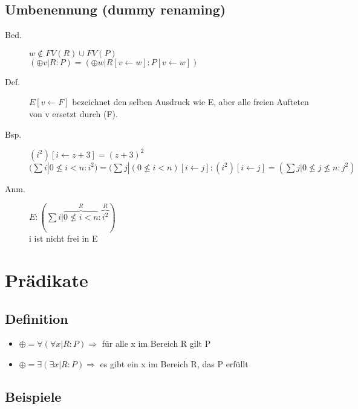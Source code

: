 \documentclass[a4paper,10pt]{article}
\newcommand{\la}{\leftarrow}
\begin{document}
\subsection{Umbenennung (dummy renaming)}
\begin{description}
	\item[Bed.] $w \notin FV(R) \cup FV(P)$ \\
		$(\oplus v | R : P) = (\oplus w | R[v \la w] : P[v \la w])$
	\item[Def.] $E[v \la F]$ bezeichnet den selben Ausdruck wie E, aber alle freien Aufteten von v ersetzt durch (F).
	\item[Bsp.] $(i^2)[i \la z+3] = (z+3)^2$ \\
		$(\sum i | 0 \nleq i < n : i^2) = (\sum j | (0 \nleq i < n)[i \la j] : (i^2)[i \la j] = (\sum j | 0 \nleq j \nleq n : j^2)$
	\item[Anm.] $E: (\sum i | \overbrace{0 \nleq i < n}^{R} : \overbrace{i^2}^{R})$ \\
		i ist nicht frei in E
\end{description}




\newpage
\section{Pr\"adikate}

\subsection{Definition}
\begin{itemize}
	\item $ \oplus =\forall  (\forall x | R:P) \Longrightarrow$ f\"ur alle x im Bereich R gilt P
	\item $ \oplus =\exists  (\exists x | R:P) \Longrightarrow$ es gibt ein x im Bereich R, das P erf\"ullt
\end{itemize}

\subsection{Beispiele}
\end{document}

